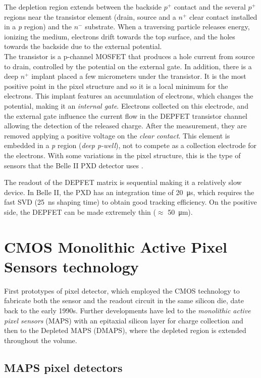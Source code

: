 The depletion region extends between the backside $p^{+}$ contact and the several $p^{+}$ regions near the transistor element (drain, source and a $n^{+}$ clear contact installed in a \textit{p} region) and the $n^{-}$ substrate. When a traversing particle releases energy, ionizing the medium, electrons drift towards the top surface, and the holes towards the backside due to the external potential.\\
The transistor is a p-channel MOSFET that produces a hole current from source to drain, controlled by the potential on the external gate. In addition, there is a deep $n^{+}$ implant placed a few micrometers under the transistor. It is the most positive point in the pixel structure and so it is a local minimum for the electrons. This implant features an accumulation of electrons, which changes the potential, making it an \textit{internal gate}. 
Electrons collected on this electrode, and the external gate influence the current flow in the DEPFET transistor channel allowing the detection of the released charge. After the measurement, they are removed applying a positive voltage on the \textit{clear contact}. This element is embedded in a \textit{p} region (\textit{deep p-well}), not to compete as a collection electrode for the electrons. With some variations in the pixel structure, this is the type of sensors that the Belle II PXD detector uses \cite{Ye:2019kmw}. 

The readout of the DEPFET matrix is sequential making it a relatively slow device. In Belle II, the PXD has an integration time of \SI{20}{\micro s}, which requires the fast SVD (\SI{25}{ns} shaping time) to obtain good tracking efficiency. On the positive side, the DEPFET can be made extremely thin ($\approx$ \SI{50}{\micro m}).


\section{CMOS Monolithic Active Pixel Sensors technology} \label{sec:MAPS}
 
First prototypes of pixel detector, which employed the CMOS technology to fabricate both the sensor and the readout circuit in the same silicon die, date back to the early 1990s. Further developments have led to the \emph{monolithic active pixel sensors} (MAPS) with an epitaxial silicon layer for charge collection and then to the Depleted MAPS (DMAPS), where the depleted region is extended throughout the volume.

\subsection{MAPS pixel detectors}

